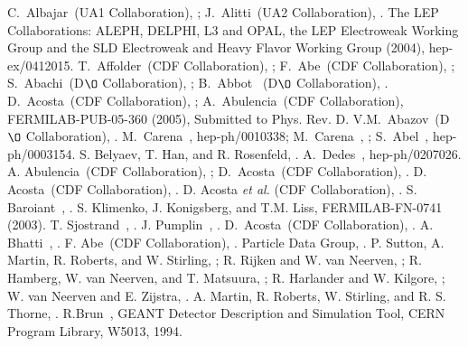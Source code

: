 \documentclass[aps,12pt,superscriptaddress,nofootinbib,floatfix,showpacs]{revtex4}
\begin{document}
\begin{thebibliography}{99}
%
%
 C.~Albajar~\etal  (UA1 Collaboration),  ;
J.~Alitti~\etal  (UA2 Collaboration),  .
 The LEP Collaborations: ALEPH, DELPHI, L3 and OPAL, the LEP Electroweak Working Group and the SLD Electroweak
and Heavy Flavor Working Group (2004), hep-ex/0412015.
 T.~Affolder~\etal (CDF Collaboration), ; 
F.~Abe~\etal  (CDF Collaboration), ; 
S.~Abachi~\etal  (D$\O$ Collaboration), ; 
B.~Abbot~\etal {} (D$\O$ Collaboration), . 
 D.~Acosta~\etal  (CDF Collaboration), ;
A.~Abulencia~\etal (CDF Collaboration), FERMILAB-PUB-05-360 (2005), Submitted to Phys. Rev. D. 
 V.M.~Abazov~\etal (D$\O$ Collaboration), .
 M.~Carena~\etal, hep-ph/0010338; M.~Carena~\etal, ; S.~Abel~\etal, hep-ph/0003154.
 S. Belyaev, T. Han, and R. Rosenfeld, .
 A.~Dedes~\etal, hep-ph/0207026.
 A. Abulencia~\etal (CDF Collaboration), ; 
D.~Acosta~\etal (CDF Collaboration),  .
 D. Acosta~\etal (CDF Collaboration), . 
  D. Acosta {\em et al.} (CDF Collaboration), .
 S. Baroiant~\etal, .
 S. Klimenko, J. Konigsberg, and T.M. Liss, FERMILAB-FN-0741 (2003). 
 T. Sjostrand~\etal, .
 J. Pumplin~\etal, .
 D.~Acosta~\etal (CDF Collaboration), .
 A. Bhatti~\etal, .
 F. Abe~\etal (CDF Collaboration), .
 Particle Data Group, .
 P. Sutton, A. Martin, R. Roberts, and W. Stirling, ;
R. Rijken and W. van Neerven, ;
R. Hamberg, W. van Neerven, and T. Matsuura, ;
R. Harlander and W. Kilgore, ;
W. van Neerven and E. Zijstra, .
 A. Martin, R. Roberts, W. Stirling, and R. S. Thorne, .
 R.Brun~\etal, GEANT Detector Description and Simulation Tool, CERN Program Library, W5013, 1994.


\end{thebibliography}
\end{document}
